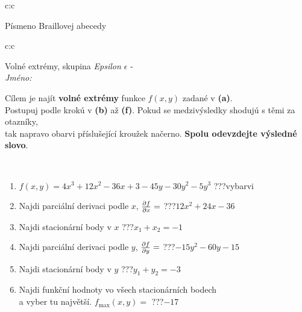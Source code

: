 \documentclass[10pt]{report}
\begin{document}
\begin{tabular}{c:c}
\begin{minipage}[c][104.5mm][t]{0.5\linewidth}
\begin{center}
\begin{minipage}{0.20\linewidth}
\begin{center}
{\small Písmeno Braillovej abecedy}
\end{center}
\end{minipage}
\end{center}
\end{minipage}
%
\end{tabular}
\newpage
\thispagestyle{empty}
\begin{tabular}{c:c}
\begin{minipage}[c][104.5mm][t]{0.5\linewidth}
\begin{center}
\vspace{7mm}
{\huge Volné extrémy, skupina \textit{Epsilon $\epsilon$} -}\\[5mm]
\textit{Jméno:}\phantom{xxxxxxxxxxxxxxxxxxxxxxxxxxxxxxxxxxxxxxxxxxxxxxxxxxxxxxxxxxxxxxxxx}\\[5mm]
\begin{minipage}{0.95\linewidth}
\begin{center}
Cílem je najít \textbf{volné extrémy} funkce $f(x,y)$ zadané v \textbf{(a)}.\\Postupuj podle krokú v \textbf{(b)} až \textbf{(f)}. Pokud se medzivýsledky shodujú s těmi za otazníky,\\tak napravo obarvi příslušející kroužek načerno. \textbf{Spolu odevzdejte výsledné slovo}.
\end{center}
\end{minipage}
\\[1mm]
\begin{minipage}{0.79\linewidth}
\begin{center}
\begin{varwidth}{\linewidth}
\begin{enumerate}
\normalsize
\item $f(x,y)=4x^3+12x^2-36x+3-45y-30y^2-5y^3$\quad \dotfill\; ???\;\dotfill \quad vybarvi
\item Najdi parciální derivaci podle $x$, $\pdv{f}{x}=$\quad \dotfill\; ???\;\dotfill \quad $12x^2+24x-36$
\item Najdi stacionární body v $x$\quad \dotfill\; ???\;\dotfill \quad $x_1+x_2=-1$
\item Najdi parciální derivaci podle $y$, $\pdv{f}{y}=$\quad \dotfill\; ???\;\dotfill \quad $-15y^2-60y-15$
\item Najdi stacionární body v $y$\quad \dotfill\; ???\;\dotfill \quad $y_1+y_2=-3$
\item Najdi funkční hodnoty vo všech stacionárních bodech \\ \phantom{xxxxxx} a vyber tu najvětší. $f_{\text{max}}(x,y)=$\quad \dotfill\; ???\;\dotfill \quad $-17$

\end{enumerate}
\end{varwidth}
\end{center}
\end{minipage}
\end{center}
\end{minipage}
\end{tabular}
\end{document}
